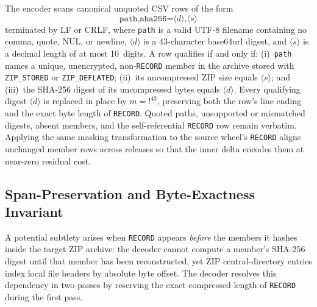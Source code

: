 \documentclass[10pt,letterpaper]{article}
\theoremstyle{remark}
\begin{document}
The encoder scans canonical unquoted CSV rows of the form
\[
  \texttt{path,sha256=}\langle d \rangle\texttt{,}\langle s \rangle
\]
terminated by LF or CRLF, where \texttt{path} is a valid UTF-8 filename containing no comma, quote, NUL, or newline, $\langle d \rangle$ is a 43-character base64url digest, and $\langle s \rangle$ is a decimal length of at most 10~digits. A row qualifies if and only if: (i)~\texttt{path} names a unique, unencrypted, non-\texttt{RECORD} member in the archive stored with \texttt{ZIP\_STORED} or \texttt{ZIP\_DEFLATED}; (ii)~its uncompressed ZIP size equals $\langle s \rangle$; and (iii)~the SHA-256 digest of its uncompressed bytes equals $\langle d \rangle$. Every qualifying digest $\langle d \rangle$ is replaced in place by $m = \texttt{!}^{43}$, preserving both the row's line ending and the exact byte length of \texttt{RECORD}. Quoted paths, unsupported or mismatched digests, absent members, and the self-referential \texttt{RECORD} row remain verbatim. Applying the same masking transformation to the source wheel's \texttt{RECORD} aligns unchanged member rows across releases so that the inner delta encodes them at near-zero residual cost.

\subsection{Span-Preservation and Byte-Exactness Invariant}
\label{sec:invariant}

A potential subtlety arises when \texttt{RECORD} appears \emph{before} the members it hashes inside the target ZIP archive: the decoder cannot compute a member's SHA-256 digest until that member has been reconstructed, yet ZIP central-directory entries index local file headers by absolute byte offset. The decoder resolves this dependency in two passes by reserving the exact compressed length of \texttt{RECORD} during the first pass.
\end{document}
